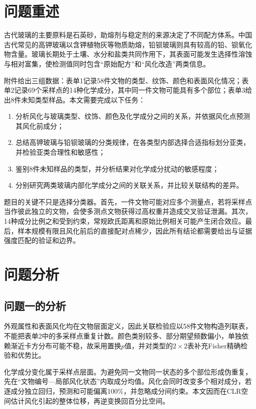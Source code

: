 \documentclass[UTF8,a4paper,zihao=-4,fontset=windows]{ctexart}
\begin{document}
\section{问题重述}

古代玻璃的主要原料是石英砂，助熔剂与稳定剂的来源决定了不同配方体系。中国古代常见的高钾玻璃以含钾植物灰等物质助熔，铅钡玻璃则具有较高的铅、钡氧化物含量。玻璃长期处于土壤、水分和盐类共同作用下，其表面可能发生选择性溶蚀与相对富集，使检测值同时包含“原始配方”和“风化改造”两类信息。

附件给出三组数据：表单1记录58件文物的类型、纹饰、颜色和表面风化情况；表单2记录69个采样点的14种化学成分，其中同一件文物可能具有多个部位；表单3给出8件未知类型样品。本文需要完成以下任务：

\begin{enumerate}
  \item 分析风化与玻璃类型、纹饰、颜色及化学成分之间的关系，并依据风化点预测其风化前成分；
  \item 总结高钾玻璃与铅钡玻璃的分类规律，在各类型内部选择合适指标划分亚类，并检验亚类合理性和敏感性；
  \item 鉴别8件未知样品的类型，并分析结果对化学成分扰动的敏感程度；
  \item 分别研究两类玻璃内部化学成分之间的关联关系，并比较关联结构的差异。
\end{enumerate}

题目的关键不只是选择分类器。首先，一件文物可能对应多个测量点，若将采样点当作彼此独立的文物，会使多测点文物获得过高权重并造成交叉验证泄漏。其次，14种成分比例之和受到约束，常规欧氏距离和原始比例相关可能产生闭合效应。最后，样本规模有限且风化前后的直接配对点稀少，因此所有结论都需要给出与证据强度匹配的验证和边界。

\section{问题分析}

\subsection{问题一的分析}

外观属性和表面风化均在文物层面定义，因此关联检验应以58件文物构造列联表，不能把表单2中的多采样点重复计数。颜色类别较多、部分期望频数偏小，单独依赖渐近卡方分布可能不稳，故采用置换$p$值，并对类型的$2\times2$表补充Fisher精确检验和优势比。

化学成分变化属于采样点层面。为避免同一文物同一状态的多个部位形成伪重复，先在“文物编号—局部风化状态”内取成分均值。风化会同时改变多个相对成分，若逐成分独立回归，预测和可能偏离100\%，并忽略成分间约束。本文因而在CLR空间估计风化引起的整体位移，再逆变换回百分比空间。
\end{document}
